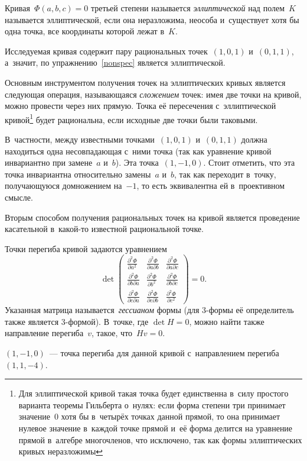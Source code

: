 \documentclass{article}
\begin{document}
\begin{definition}
  Кривая~$\Phi(a, b, c) = 0$ третьей степени называется \emph{эллиптической} над
  полем~$K$ называется эллиптической, если она неразложима, неособа и~существует
  хотя бы одна точка, все координаты которой лежат в~$K$.
\end{definition}

\begin{remark}
  Исследуемая кривая содержит пару рациональных точек~$(1, 0, 1)$ и~$(0, 1, 1)$,
  а~значит, по упражнению~\ref{nonspec} является эллиптической.
\end{remark}

Основным инструментом получения точек на эллиптических кривых является следующая
операция, называющаяся \emph{сложением} точек: имея две точки на кривой, можно
провести через них прямую. Точка её пересечения с~эллиптической
кривой\footnote{Для эллиптической кривой такая точка будет единственна в~силу
простого варианта теоремы Гильберта о~нулях: если форма степени три принимает
значение~0 хотя бы в~четырёх точках данной прямой, то она принимает нулевое
значение в~каждой точке прямой и~её форма делится на уравнение прямой в~алгебре
многочленов, что исключено, так как формы эллиптических кривых неразложимы}
будет рациональна, если исходные две точки были таковыми.

В~частности, между известными точками~$(1, 0, 1)$ и~$(0, 1, 1)$ должна
находиться одна несовпадающая с~ними точка (так как уравнение кривой инвариантно
при замене~$a$ и~$b$). Эта точка~$(1, -1, 0)$. Стоит отметить, что эта точка
инвариантна относительно замены~$a$ и~$b$, так как переходит в~точку,
получающуюся домножением на~$-1$, то есть эквивалентна ей в~проективном смысле.

Вторым способом получения рациональных точек на кривой является проведение
касательной в~какой-то известной рациональной точке.
\begin{remark}
  Точки перегиба кривой задаются уравнением
\[
\det \left(
\begin{array}{ccc}
  \frac{\partial^2 \Phi}{\partial a^2} &
  \frac{\partial^2 \Phi}{\partial a \partial b} &
  \frac{\partial^2 \Phi}{\partial a \partial c} \\
  \frac{\partial^2 \Phi}{\partial b \partial a} &
  \frac{\partial^2 \Phi}{\partial b^2} &
  \frac{\partial^2 \Phi}{\partial b \partial c} \\
  \frac{\partial^2 \Phi}{\partial c \partial a} &
  \frac{\partial^2 \Phi}{\partial c \partial b} &
  \frac{\partial^2 \Phi}{\partial c^2}
\end{array} \right) = 0.
\]
Указанная матрица называется~\emph{гессианом} формы (для 3-формы её определитель
также является 3-формой). В~точке, где $\det H = 0$, можно найти также
направление перегиба~$v$, такое, что~$Hv = 0$.
\end{remark}
\begin{exercise}
  $(1, -1, 0)$~--- точка перегиба для данной кривой с~направлением перегиба~$(1,
  1, -4)$.
\end{exercise}
\end{document}
